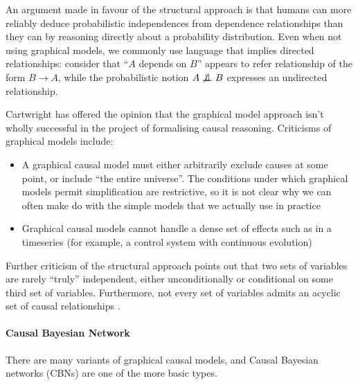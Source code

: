 An argument made in favour of the structural approach is that humans can more reliably deduce probabilistic independences from dependence relationships than they can by reasoning directly about a probability distribution. Even when not using graphical models, we commonly use language that implies directed relationships: consider that ``$A$ depends on $B$'' appears to refer relationship of the form $B\to A$, while the probabilistic notion $A\not\CI B$ expresses an undirected relationship\cite{pearl_causality:_2009}. 

Cartwright has offered the opinion that the graphical model approach isn't wholly successful in the project of formalising causal reasoning\cite{cartwright_causation:_2004}. Criticisms of graphical models include:
\begin{itemize}
    \item A graphical causal model must either arbitrarily exclude causes at some point, or include ``the entire universe''. The conditions under which graphical models permit simplification are restrictive\cite{rubenstein_causal_2017}, so it is not clear why we can often make do with the simple models that we actually use in practice
    \item Graphical causal models cannot handle a dense set of effects such as in a timeseries (for example, a control system with continuous evolution)
\end{itemize}

Further criticism of the structural approach points out that two sets of variables are rarely ``truly'' independent, either unconditionally or conditional on some third set of variables. Furthermore, not every set of variables admits an acyclic set of causal relationships \cite{gelman_causality_2011}.

\paragraph{Causal Bayesian Network}

There are many variants of graphical causal models, and Causal Bayesian networks (CBNs) are one of the more basic types.

